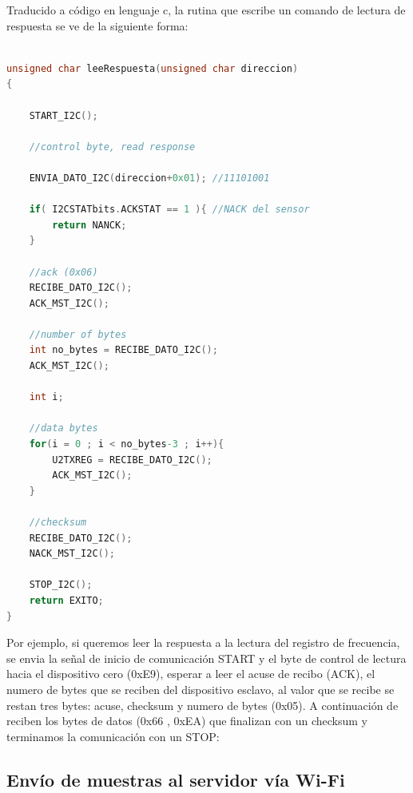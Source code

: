 Traducido a código en lenguaje c, la rutina que escribe un comando de lectura de respuesta se ve de la siguiente forma:

\begin{lstlisting}[language=C]

unsigned char leeRespuesta(unsigned char direccion)
{   
    
    START_I2C();
    
    //control byte, read response
    
    ENVIA_DATO_I2C(direccion+0x01); //11101001   
    
    if( I2CSTATbits.ACKSTAT == 1 ){ //NACK del sensor
        return NANCK;
    }

    //ack (0x06)
    RECIBE_DATO_I2C();
    ACK_MST_I2C();
    
    //number of bytes 
    int no_bytes = RECIBE_DATO_I2C();
    ACK_MST_I2C();
    
    int i;
    
    //data bytes
    for(i = 0 ; i < no_bytes-3 ; i++){
        U2TXREG = RECIBE_DATO_I2C();
        ACK_MST_I2C();
    }
    
    //checksum
    RECIBE_DATO_I2C();
    NACK_MST_I2C();
    
    STOP_I2C();  
    return EXITO;
}

\end{lstlisting}


Por ejemplo, si queremos leer la respuesta a la lectura del registro de frecuencia, se envia la señal de inicio de comunicación START y el byte de control de lectura hacia el dispositivo cero (0xE9), esperar a leer el acuse de recibo (ACK), el numero de bytes que se reciben del dispositivo esclavo, al valor que se recibe se restan tres bytes: acuse, checksum y numero de bytes (0x05). A continuación de reciben los bytes de datos (0x66 , 0xEA) que finalizan con un checksum y terminamos la comunicación con un STOP:

\paragraph{}
\par

\subsection{Envío de muestras al servidor vía Wi-Fi}

